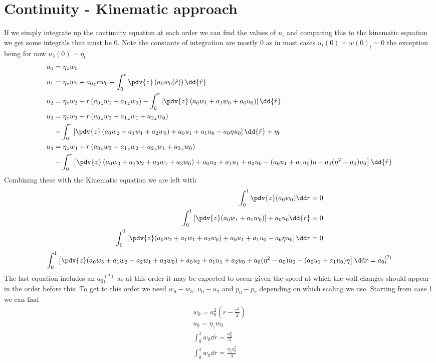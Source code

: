 \documentclass[12pt]{article}
\begin{document}
\section{Continuity - Kinematic approach}
If we simply integrate up the continuity equation at each order we can find the values of $u_i$
and comparing this to the kinematic equation we get some integrals that must be 0. Note the constants of integration are mostly 0 as in most cases $u_i(0)=w(0)_i = 0$ the exception being for now $u_3(0) = \eta_t$
\begin{align}
u_0 & = \eta_z w_0\\
u_1 & = \eta_z w_1 + {a_0}_z r w_0 -\int_{0}^{r}\pdv{z}\left(a_0w_0(\hat r)\right)\dd{\hat r}\\
u_2 & = \eta_z w_2 + r\left({a_0}_zw_1 + {a_1}_zw_0 \right)-\int_{0}^r\left[\pdv{z}\left(a_0w_1+a_1w_0+a_0u_0\right)\right]\dd{\hat r}\\
u_3 & = \eta_z w_3 + r\left({a_0}_zw_2+{a_1}_zw_1+{a_2}_zw_0\right)\\
&-\int_{0}^r\left[\pdv{z}\left(a_0w_2+a_1w_1+a_2w_0\right)+a_0u_1+a_1u_0-a_0\eta u_0\right]\dd{\hat r}+\eta_t\\
u_4 & =  \eta_z w_4 + r\left({a_0}_zw_3+{a_1}_zw_2+{a_2}_zw_1+{a_3}_z w_0\right)\\
&-\int_{0}^r\left[\pdv{z}\left(a_0w_3+a_1w_2+a_2w_1+a_3w_0\right)+a_0u_2+a_1u_1+a_2u_0-(a_0u_1+a_1u_0)\eta - a_0(\eta^2 - a_0) u_0\right]\dd{\hat r}\\
\end{align}
Combining these with the Kinematic equation we are left  with 
\begin{align}
\int_{0}^1\pdv{z}(a_0w_0)\dd r = 0\\
\int_{0}^1\left[\pdv{z}(a_0w_1+a_1w_0)\right]+a_0u_0\dd{r} = 0\\
\int_0^1\left[\pdv{z}(a_0w_2+a_1w_1+a_2w_0)+a_0u_1 +a_1 u_0 - a_0\eta u_0\right]\dd r=0\end{align}\begin{align}
\int_0^1\left[\pdv{z}(a_0w_3+a_1w_2+a_2w_1+a_3 w_0)+a_0u_2 +a_1u_1 +a_2u_0+a_0(\eta^2 - a_0)u_0-(a_0 u_1 +a_1u_0)\eta\right]\dd r = {a_0}_t^{(?)}
\end{align}
The last equation includes an ${a_0}_t^{(?)}$ as at this order it may be expected to occur given the speed at which the wall changes should appear in the order before this.
To get to this order we need $w_0 - w_3$, $u_0 - u_2$ and $p_0 - p_2$ depending on which scaling we use. 
Starting from case 1 we can find
\begin{align}
w_0 = a_0^2(r-\frac{r^2}{2})\\
u_0 = \eta_z w_0 \\
\int_0^1 w_0 \dd r = \frac{a_0^2}{3}\\
\int_0^1 w_0 \dd r = \frac{\eta_z a_0^2}{3}\\
\end{align}
\end{document}
